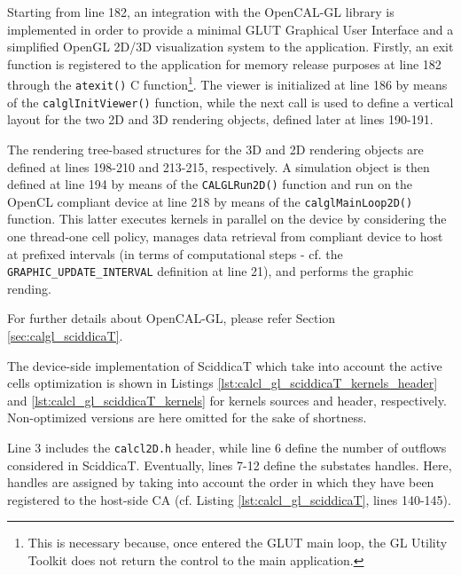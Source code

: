 Starting from line 182, an integration with the OpenCAL-GL library is
implemented in order to provide a minimal GLUT Graphical User
Interface and a simplified OpenGL 2D/3D visualization system to the
application. Firstly, an exit function is registered to the
application for memory release purposes at line 182 through the
\verb'atexit()' C function\footnote{This is necessary because, once
  entered the GLUT main loop, the GL Utility Toolkit does not return
  the control to the main application.}. The viewer is initialized at
line 186 by means of the \verb'calglInitViewer()' function, while the
next call is used to define a vertical layout for the two 2D and 3D
rendering objects, defined later at lines 190-191.

The rendering tree-based structures for the 3D and 2D rendering
objects are defined at lines 198-210 and 213-215, respectively. A
simulation object is then defined at line 194 by means of the
\verb'CALGLRun2D()' function and run on the OpenCL compliant device at
line 218 by means of the \verb'calglMainLoop2D()' function. This
latter executes kernels in parallel on the device by considering the
one thread-one cell policy, manages data retrieval from compliant
device to host at prefixed intervals (in terms of computational steps
- cf. the \verb'GRAPHIC_UPDATE_INTERVAL' definition at line 21), and
performs the graphic rending.

For further details about OpenCAL-GL, please refer Section \ref{sec:calgl_sciddicaT}.





The device-side implementation of SciddicaT which take into account
the active cells optimization is shown in Listings
\ref{lst:calcl_gl_sciddicaT_kernels_header} and
\ref{lst:calcl_gl_sciddicaT_kernels} for kernels sources and header,
respectively. Non-optimized versions are here omitted for the sake of
shortness.

Line 3 includes the \verb'calcl2D.h' header, while line 6 define the
number of outflows considered in SciddicaT. Eventually, lines 7-12
define the substates handles. Here, handles are assigned by taking
into account the order in which they have been registered to the
host-side CA (cf. Listing \ref{lst:calcl_gl_sciddicaT}, lines
140-145).


